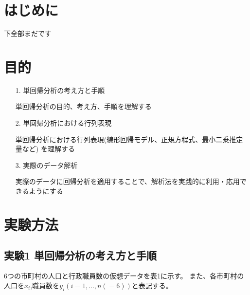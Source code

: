 \documentclass[12pt]{jarticle}
\begin{document}



\section{はじめに}
下全部まだです

\section{目的}
\begin{itemize}
    \item [1.]単回帰分析の考え方と手順

          単回帰分析の目的、考え方、手順を理解する
    \item [2.]単回帰分析における行列表現

          単回帰分析における行列表現(線形回帰モデル、正規方程式、最小二乗推定量など)
          を理解する
    \item [3.]実際のデータ解析

          実際のデータに回帰分析を適用することで、解析法を実践的に利用・応用できるようにする
\end{itemize}

\section{実験方法}
\subsection{実験1 単回帰分析の考え方と手順}
6つの市町村の人口と行政職員数の仮想データを表1に示す。
また、各市町村の人口を$x_i$,職員数を$y_i(i=1,...,n(=6))$と表記する。
\end{document}
